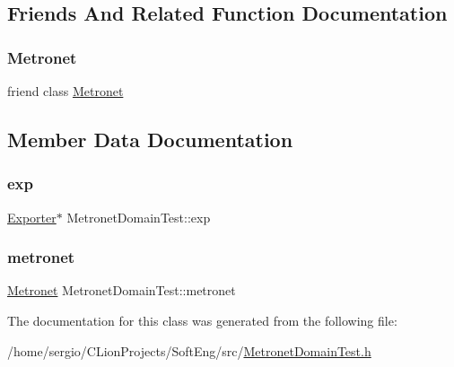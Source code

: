 \subsection{Friends And Related Function Documentation}
\mbox{\label{class_metronet_domain_test_a07c94fb69880743e62f64a941fc2d4ab}} 
\subsubsection{\texorpdfstring{Metronet}{Metronet}}
{\footnotesize\ttfamily friend class \hyperlink{class_metronet}{Metronet}\hspace{0.3cm}{\ttfamily [friend]}}



\subsection{Member Data Documentation}
\mbox{\label{class_metronet_domain_test_a6e7c903d4485d95a766f8ff01989d529}} 
\subsubsection{\texorpdfstring{exp}{exp}}
{\footnotesize\ttfamily \hyperlink{class_exporter}{Exporter}$\ast$ Metronet\+Domain\+Test\+::exp\hspace{0.3cm}{\ttfamily [protected]}}

\mbox{\label{class_metronet_domain_test_aa185f99af6607124a6fea8c4f63fddb7}} 
\subsubsection{\texorpdfstring{metronet}{metronet}}
{\footnotesize\ttfamily \hyperlink{class_metronet}{Metronet} Metronet\+Domain\+Test\+::metronet\hspace{0.3cm}{\ttfamily [protected]}}



The documentation for this class was generated from the following file\+:\begin{DoxyCompactItemize}
\item 
/home/sergio/\+C\+Lion\+Projects/\+Soft\+Eng/src/\hyperlink{_metronet_domain_test_8h}{Metronet\+Domain\+Test.\+h}\end{DoxyCompactItemize}
